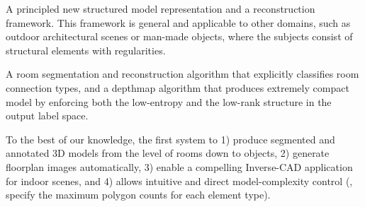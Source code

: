  A principled new structured
model representation and a reconstruction framework. This framework is
general and applicable to other domains, such as outdoor architectural
scenes or man-made objects,
where the subjects consist of structural elements with regularities.


 A room segmentation and
reconstruction algorithm that explicitly classifies room connection
types, and a depthmap algorithm that produces extremely compact model by
enforcing both the low-entropy and the low-rank structure in the output
label space.

 To the best of our knowledge,
the first system to 1) produce segmented and annotated 3D models from
the level of rooms down to objects, 2) generate floorplan images
automatically, 3) enable a compelling Inverse-CAD application for indoor
scenes, and 4) allows intuitive and direct model-complexity control
(\eg, specify the maximum polygon counts for each element type).









